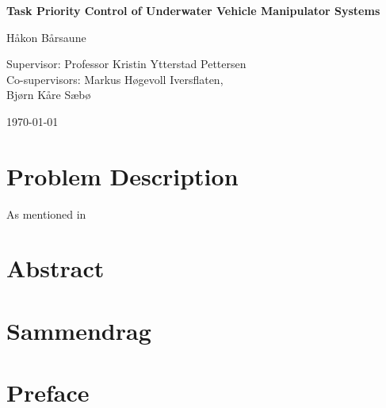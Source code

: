 \documentclass[10pt,b5paper,openright]{book}
\begin{document}
\begin{titlepage}
    \begin{center}
        \vspace*{1cm}
        \huge{\textbf{Task Priority Control of Underwater Vehicle Manipulator Systems}}
        \vspace{2cm}

        \Large{Håkon Bårsaune}
        \vspace{2cm}

        \large{
            Supervisor: Professor Kristin Ytterstad Pettersen \\
            Co-supervisors: Markus Høgevoll Iversflaten, \\
            Bjørn Kåre Sæbø %
        }

        \vspace{2cm}
        \today
        \vfill
        \begin{figure}[htbp]
            \centering
            
        \end{figure}
    \end{center}
\end{titlepage}

\clearpage
\restoregeometry 


\section*{Problem Description}

As mentioned in \cite{nakamura1987}
\newpage

\section*{Abstract}
\newpage

\section*{Sammendrag}
\newpage

\section*{Preface}
\newpage
\end{document}
